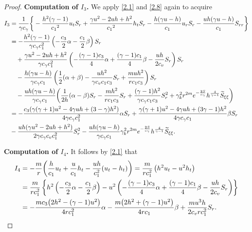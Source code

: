 \documentclass[11pt,reqno]{article}
\numberwithin{equation}{section}
\begin{document}
\begin{proof}
\noindent\textbf{Computation of $I_3$.}
We apply \eqref{2.1} and \eqref{2.8} again to acquire
\begin{align}
I_3 &= \frac{1}{\gamma c_\gamma}\bigg\{
       -\frac{h^2(\gamma-1)}{{c_1}^2}u_tS_r+\frac{\gamma u^2-2uh+h^2}{{c_1}^2}h_tS_r- \frac{h(\gamma u-h)}{c_1}u_rS_r-
       \frac{uh(\gamma u-h)}{c_1}S_{rr}\bigg\}\nonumber\\
       &=
-\frac{h^2(\gamma-1)}{\gamma c_\gamma c_1^2}\left( -\frac{c_3}{2}\alpha - \frac{c_1}{2}\beta \right)S_r \nonumber \\
&\quad +\frac{\gamma u^2-2uh+h^2}{\gamma c_\gamma c_1^2}\left( -\frac{(\gamma-1)c_3}{4}\alpha + \frac{(\gamma-1)c_1}{4}\beta - \frac{uh}{2c_v} S_r \right)S_r \notag \\
&\quad - \frac{h(\gamma u-h)}{\gamma c_\gamma c_1}\left( \frac12(\alpha+\beta) - \frac{uh^2}{\gamma c_v c_1 c_3} S_r + \frac{m u h^2}{r c_1 c_3} \right)S_r \nonumber \\
&\quad -\frac{uh(\gamma u-h)}{\gamma c_\gamma c_1}\bigg( \frac{1}{2h}(\alpha-\beta) S_r - \frac{m h^2}{r c_1 c_3} S_r + \frac{(\gamma-1) h^2}{\gamma c_\gamma c_1 c_3} S_r^2 \notag + \gamma_k^2 r^{2m} e^{-\frac{2S}{c_\gamma}} h^{\frac{4}{\gamma-1}} \widetilde{S}_{\xi\xi} \bigg)
\\
&= -\frac{c_3(\gamma(\gamma+1)u^2-4\gamma uh + (3-\gamma)h^2)}{4\gamma c_\gamma c_1^2}\alpha S_r
    + \frac{\gamma(\gamma+1)u^2-4\gamma uh+(3\gamma-1)h^2}{4\gamma c_\gamma c_1}\beta S_r
    \nonumber\\
    &-\frac{uh(\gamma u^2-2uh+h^2)}{2\gamma c_\gamma c_vc_1^2} S_r^2
    -\frac{uh(\gamma u-h)}{\gamma c_\gamma c_1} \gamma_k^2 r^{2m} e^{-\frac{2S}{c_\gamma}} h^{\frac{4}{\gamma-1}}  \widetilde{S}_{\xi\xi}. \notag
\end{align}


\noindent\textbf{Computation of $I_4$.}
It follows by \eqref{2.1} that
 \begin{align}
 I_4 &= -\frac{m}{r}\bigg(\frac{h}{c_1}u_t+\frac{u}{c_1}h_t-\frac{uh}{c_1^2}(u_t-h_t)\bigg)= \frac{m}{r c_1^2}\left( h^2 u_t - u^2 h_t \right) \nonumber\\
    &= \frac{m}{r c_1^2}\left\{ h^2\left( -\frac{c_3}{2}\alpha - \frac{c_1}{2}\beta \right) - u^2\left( -\frac{(\gamma-1)c_3}{4}\alpha + \frac{(\gamma-1)c_1}{4}\beta - \frac{u h}{2c_v} S_r \right) \right\} \nonumber\\
    &= -\frac{m c_3\big( 2h^2 - (\gamma-1)u^2 \big)}{4r c_1^2} \alpha - \frac{m\big( 2h^2 + (\gamma-1)u^2 \big)}{4r c_1} \beta + \frac{m u^3 h}{2c_v r c_1^2} S_r. \notag
 \end{align}


\end{proof}
\end{document}
